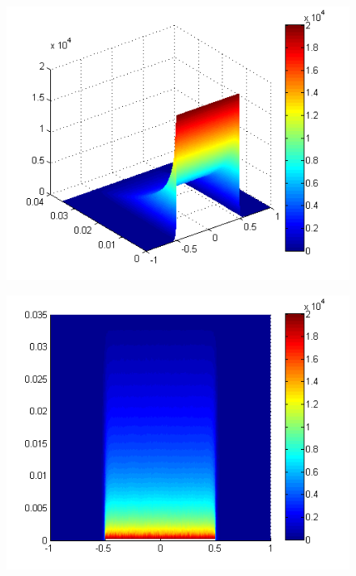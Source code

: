 \documentclass[a4paper,12pt]{article}
\begin{document}
\begin{figure}[h]
   \begin{minipage}[c]{.32\linewidth}
      \includegraphics[width=1\textwidth,height=0.8\textwidth]{images/v_3d}
      \label{f v_3d}
   \end{minipage} \hfill
   \begin{minipage}[c]{.32\linewidth}
      \includegraphics[width=1\textwidth,height=0.8\textwidth]{images/v_xy}
      \label{f v_xy}
   \end{minipage} \hfill
   \begin{minipage}[c]{.32\linewidth}

\end{minipage}
\end{figure}
\end{document}
